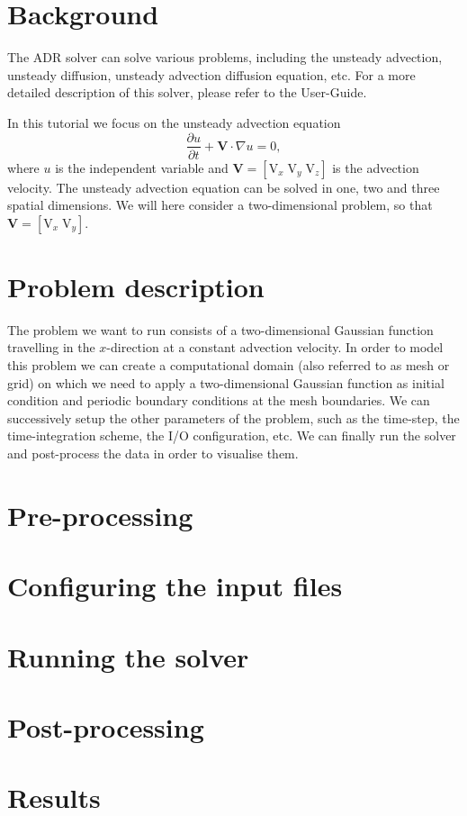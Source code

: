 \section{Background}
The ADR solver can solve various problems, including the unsteady advection, unsteady diffusion, 
unsteady advection diffusion equation, etc. For a more detailed description of this solver, please 
refer to the User-Guide. 

In this tutorial we focus on the unsteady advection equation
\begin{equation}
\dfrac{\partial u}{\partial t} + \mathbf{V}\cdot\nabla u = 0,
\label{eq:advection}
\end{equation}
where $u$ is the independent variable and $\mathbf{V} = [\text{V}_{x}\; \text{V}_{y}\; \text{V}_{z}]$ 
is the advection velocity. The unsteady advection equation can be solved in one, two and three spatial 
dimensions. We will here consider a two-dimensional problem, so that $\mathbf{V} = [\text{V}_{x}\; \text{V}_{y}]$.

\section{Problem description}
The problem we want to run consists of a two-dimensional Gaussian function travelling in the $x$-direction
at a constant advection velocity. In order to model this problem we can create a computational domain 
(also referred to as mesh or grid) on which we need to apply a two-dimensional Gaussian function 
as initial condition and periodic boundary conditions at the mesh boundaries. 
We can successively setup the other parameters of the problem, such as the time-step, the time-integration 
scheme, the I/O configuration, etc.
We can finally run the solver and post-process the data in order to visualise them.

\section{Pre-processing}


\section{Configuring the input files}
 

\section{Running the solver}


\section{Post-processing}


\section{Results}